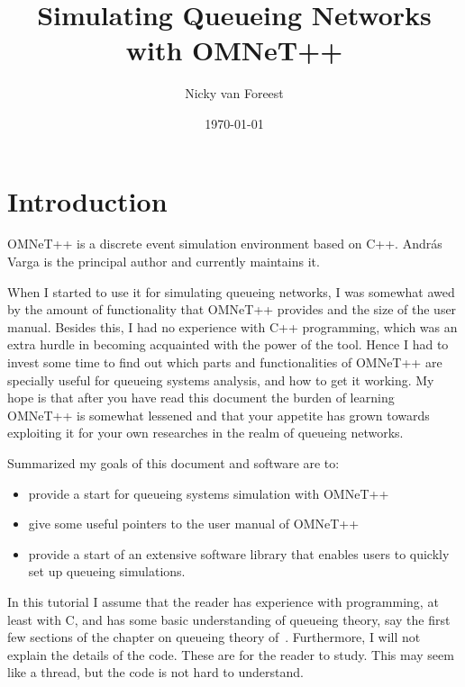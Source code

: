 \documentclass[a4paper]{article}
\date{\today}
\author{Nicky van Foreest}
\title{Simulating Queueing Networks with OMNeT++}
\begin{document}
\maketitle {}
\tableofcontents

\section{Introduction}
\label{sec:introduction}
OMNeT++ is a discrete event simulation environment based on C++. Andr{\'a}s
Varga is the principal author and currently maintains it.

 When I
started to use it for simulating queueing networks, I was somewhat
awed by the amount of functionality that OMNeT++ provides and the size
of the user manual. Besides this, I had no experience with C++
programming, which was an extra hurdle in becoming acquainted with the
power of the tool. Hence I had to invest some time to find out which
parts and functionalities of OMNeT++ are specially useful for queueing
systems analysis, and how to get it working. My hope is that after you
have read this document the burden of learning OMNeT++ is somewhat
lessened and that your appetite has grown towards exploiting it for
your own researches in the realm of queueing networks.

Summarized my goals of this document and software are to:
\begin{itemize}
\item provide a start for queueing systems simulation with OMNeT++
\item give some useful pointers to the user manual of OMNeT++
\item provide a start of an extensive software library that enables
  users to quickly set up queueing simulations.
\end{itemize}

In this tutorial I assume that the reader has experience with
programming, at least with C, and has some basic understanding of
queueing theory, say the first few sections of the chapter on queueing
theory of~\cite{Ross93}.  Furthermore, I will not explain the details
of the code. These are  for the reader to study. This may seem like a
thread, but the code is not hard to understand.
\end{document}
